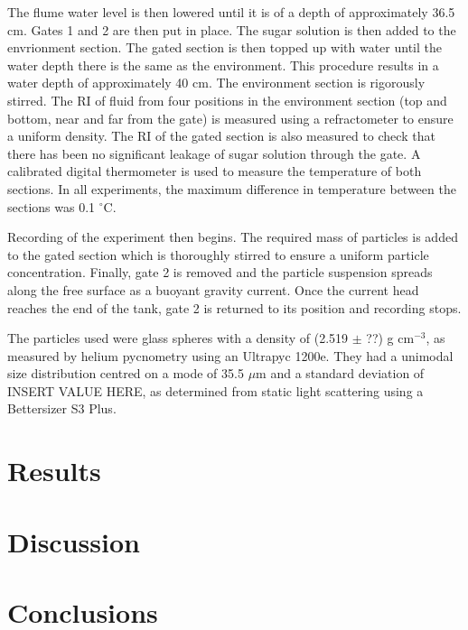 \documentclass[authoryear,preprint,review,12pt]{elsarticle}
\begin{document}
The flume water level is then lowered until it is of a depth of approximately 36.5 cm. Gates 1 and 2 are then put in place. The sugar solution is then added to the envrionment section. The gated section is then topped up with water until the water depth there is the same as the environment. This procedure results in a water depth of approximately 40 cm. The environment section is rigorously stirred. The RI of fluid from four positions in the environment section (top and bottom, near and far from the gate) is measured using a refractometer to ensure a uniform density. The RI of the gated section is also measured to check that there has been no significant leakage of sugar solution through the gate. A calibrated digital thermometer is used to measure the temperature of both sections. In all experiments, the maximum difference in temperature between the sections was 0.1 $^{\circ}$C.

Recording of the experiment then begins. The required mass of particles is added to the gated section which is thoroughly stirred to ensure a uniform particle concentration. Finally, gate 2 is removed and the particle suspension spreads along the free surface as a buoyant gravity current. Once the current head reaches the end of the tank, gate 2 is returned to its position and recording stops. 

The particles used were glass spheres with a density of (2.519 $\pm$ ??) g cm$^{-3}$, as measured by helium pycnometry using an Ultrapyc 1200e. They had a unimodal size distribution centred on a mode of 35.5 $\mu$m and a standard deviation of INSERT VALUE HERE, as determined from static light scattering using a Bettersizer S3 Plus.

\section{Results}
\label{sec:res}

\section{Discussion}
\label{sec:dis}

\section{Conclusions}
\label{sec:conc}

\end{document}
